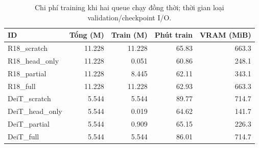 \begin{table}[htbp]
\centering\small
\caption{Chi phí training khi hai queue chạy đồng thời; thời gian loại validation/checkpoint I/O.}\label{tab:A1cost}
\begin{lrbox}{\reporttable}\begin{tabular}{lrrrr}
\toprule
ID & Tổng (M) & Train (M) & Phút train & VRAM (MiB) \\
\midrule
R18\_scratch & 11.228 & 11.228 & 65.83 & 663.3 \\
R18\_head\_only & 11.228 & 0.051 & 60.86 & 248.1 \\
R18\_partial & 11.228 & 8.445 & 62.11 & 343.1 \\
R18\_full & 11.228 & 11.228 & 62.93 & 663.3 \\
DeiT\_scratch & 5.544 & 5.544 & 89.77 & 714.7 \\
DeiT\_head\_only & 5.544 & 0.019 & 64.62 & 141.7 \\
DeiT\_partial & 5.544 & 0.909 & 65.15 & 226.3 \\
DeiT\_full & 5.544 & 5.544 & 86.01 & 714.7 \\
\bottomrule
\end{tabular}\end{lrbox}
\ifdim\wd\reporttable>\linewidth\resizebox{\linewidth}{!}{\usebox{\reporttable}}\else\usebox{\reporttable}\fi
\end{table}
